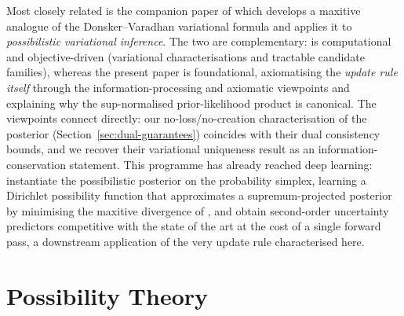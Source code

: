 \documentclass[accepted]{uai2026} %
\theoremstyle{remark}
\begin{document}
Most closely related is the companion paper of \citet{singh2025maxitive} which develops a maxitive analogue of the Donsker--Varadhan variational formula and applies it to \emph{possibilistic variational inference}. The two are complementary: \citet{singh2025maxitive} is computational and objective-driven (variational characterisations and tractable candidate families), whereas the present paper is foundational, axiomatising the \emph{update rule itself} through the information-processing and axiomatic viewpoints and explaining why the sup-normalised prior-likelihood product is canonical. The viewpoints connect directly: our no-loss/no-creation characterisation of the posterior (Section~\ref{sec:dual-guarantees}) coincides with their dual consistency bounds, and we recover their variational uniqueness result as an information-conservation statement. This programme has already reached deep learning: \citet{ni2026possibilistic} instantiate the possibilistic posterior on the probability simplex, learning a Dirichlet possibility function that approximates a supremum-projected posterior by minimising the maxitive divergence of \citet{singh2025maxitive}, and obtain second-order uncertainty predictors competitive with the state of the art at the cost of a single forward pass, a downstream application of the very update rule characterised here.


\section{Possibility Theory}
\label{sec:possibility_theory}
\end{document}
